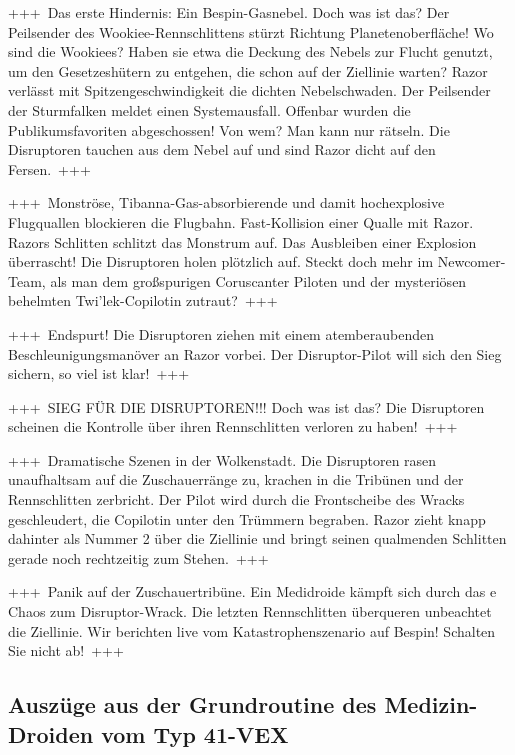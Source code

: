 +++~Das erste Hindernis: Ein Bespin-Gasnebel.
    Doch was ist das?
    Der Peilsender des Wookiee-Rennschlittens stürzt Richtung Planetenoberfläche!
    Wo sind die Wookiees?
    Haben sie etwa die Deckung des Nebels zur Flucht genutzt, um den Gesetzeshütern zu entgehen, die schon auf der Ziellinie warten?
    Razor verlässt mit Spitzengeschwindigkeit die dichten Nebelschwaden.
    Der Peilsender der Sturmfalken meldet einen Systemausfall.
    Offenbar wurden die Publikumsfavoriten abgeschossen!
    Von wem?
    Man kann nur rätseln.
    Die Disruptoren tauchen aus dem Nebel auf und sind Razor dicht auf den Fersen.~+++

+++~Monströse, Tibanna-Gas-absorbierende und damit hochexplosive Flugquallen blockieren die Flugbahn.
    Fast-Kollision einer Qualle mit Razor.
    Razors Schlitten schlitzt das Monstrum auf.
    Das Ausbleiben einer Explosion überrascht! Die Disruptoren holen plötzlich auf.
    Steckt doch mehr im Newcomer-Team, als man dem großspurigen Coruscanter Piloten und der mysteriösen behelmten Twi’lek-Copilotin zutraut?~+++

+++~Endspurt!
    Die Disruptoren ziehen mit einem atemberaubenden Beschleunigungsmanöver an Razor vorbei.
    Der Disruptor-Pilot will sich den Sieg sichern, so viel ist klar!~+++

+++~SIEG FÜR DIE DISRUPTOREN!!!
    Doch was ist das?
    Die Disruptoren scheinen die Kontrolle über ihren Rennschlitten verloren zu haben!~+++

+++~Dramatische Szenen in der Wolkenstadt.
    Die Disruptoren rasen unaufhaltsam auf die Zuschauerränge zu, krachen in die Tribünen und der Rennschlitten zerbricht.
    Der Pilot wird durch die Frontscheibe des Wracks geschleudert, die Copilotin unter den Trümmern begraben.
    Razor zieht knapp dahinter als Nummer 2 über die Ziellinie und bringt seinen qualmenden Schlitten gerade noch rechtzeitig zum Stehen.~+++

+++~Panik auf der Zuschauertribüne.
    Ein Medidroide kämpft sich durch das e Chaos zum Disruptor-Wrack.
    Die letzten Rennschlitten überqueren unbeachtet die Ziellinie.
    Wir berichten live vom Katastrophenszenario auf Bespin! Schalten Sie nicht ab!~+++

\setlength{\parskip}{0pt}
\setbeforeparaskip{0pt}
\subsection{Auszüge aus der Grundroutine des Medizin-Droiden vom Typ 41-VEX}

